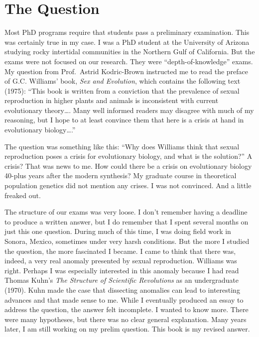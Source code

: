 \documentclass[
  letterpaper,
]{book}
\begin{document}
\section{The Question}\label{the-question}

Most PhD programs require that students pass a preliminary examination.
This was certainly true in my case. I was a PhD student at the
University of Arizona studying rocky intertidal communities in the
Northern Gulf of California. But the exams were not focused on our
research. They were ``depth-of-knowledge'' exams. My question from
Prof.~Astrid Kodric-Brown instructed me to read the preface of G.C.
Williams' book, \emph{Sex and Evolution}, which contains the following
text (1975): ``This book is written from a conviction that the
prevalence of sexual reproduction in higher plants and animals is
inconsistent with current evolutionary theory\ldots. Many well informed
readers may disagree with much of my reasoning, but I hope to at least
convince them that here is a crisis at hand in evolutionary
biology\ldots.''

The question was something like this: ``Why does Williams think that
sexual reproduction poses a crisis for evolutionary biology, and what is
the solution?'' A crisis? That was news to me. How could there be a
crisis on evolutionary biology 40-plus years after the modern synthesis?
My graduate course in theoretical population genetics did not mention
any crises. I was not convinced. And a little freaked out.

The structure of our exams was very loose. I don't remember having a
deadline to produce a written answer, but I do remember that I spent
several months on just this one question. During much of this time, I
was doing field work in Sonora, Mexico, sometimes under very harsh
conditions. But the more I studied the question, the more fascinated I
became. I came to think that there was, indeed, a very real anomaly
presented by sexual reproduction. Williams was right. Perhaps I was
especially interested in this anomaly because I had read Thomas Kuhn's
\emph{The Structure of Scientific Revolutions} as an undergraduate
(1970). Kuhn made the case that dissecting anomalies can lead to
interesting advances and that made sense to me. While I eventually
produced an essay to address the question, the answer felt incomplete. I
wanted to know more. There were many hypotheses, but there was no clear
general explanation. Many years later, I am still working on my prelim
question. This book is my revised answer.
\end{document}
